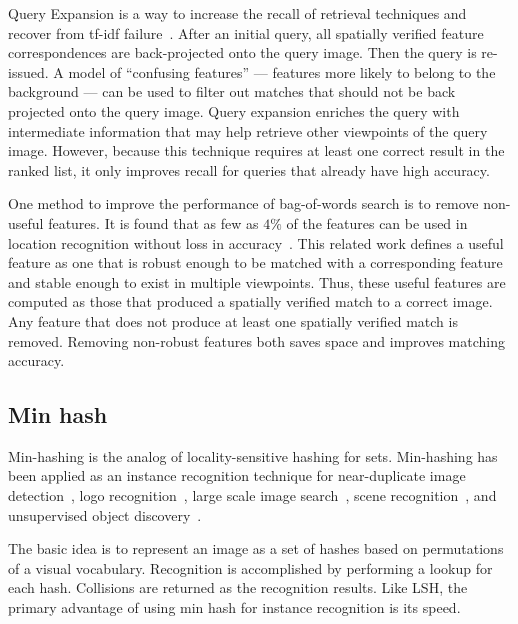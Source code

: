             Query Expansion is a way to increase the recall of retrieval techniques and recover from tf-idf
            failure~\cite{chum_total_2007, chum_total_2011, arandjelovic_three_2012, tolias_visual_2014}. After an
            initial query, all spatially verified feature correspondences are back-projected onto the query image.
            Then the query is re-issued. A model of ``confusing features'' --- features more likely to belong
            to the background --- can be used to filter out matches that should not be back projected onto the
            query image. Query expansion enriches the query with intermediate information that may help retrieve
            other viewpoints of the query image. However, because this technique requires at least one correct
            result in the ranked list, it only improves recall for queries that already have high accuracy.

            One method to improve the performance of bag-of-words search is to remove non-useful features. It is
            found that as few as $4\percent$ of the features can be used in location recognition without loss in
            accuracy~\cite{turcot_better_2009}. This related work defines a useful feature as one that is robust
            enough to be matched with a corresponding feature and stable enough to exist in multiple viewpoints.
            Thus, these useful features are computed as those that produced a spatially verified match to a correct
            image. Any feature that does not produce at least one spatially verified match is removed. Removing
            non-robust features both saves space and improves matching accuracy.

    \subsection{Min hash}
        Min-hashing is the analog of locality-sensitive hashing for sets. Min-hashing has been applied as an
        instance recognition technique for near-duplicate image detection~\cite{chum_near_2008}, logo
        recognition~\cite{romberg_bundle_2013}, large scale image search~\cite{wang_semi_supervised_2012}, scene
        recognition~\cite{zhang_image_2011}, and unsupervised object discovery~\cite{chum_geometric_2009,
        chum_large_scale_2010}.

        The basic idea is to represent an image as a set of hashes based on permutations of a visual vocabulary.
        Recognition is accomplished by performing a lookup for each hash. Collisions are returned as the recognition
        results. Like LSH, the primary advantage of using min hash for instance recognition is its speed.


